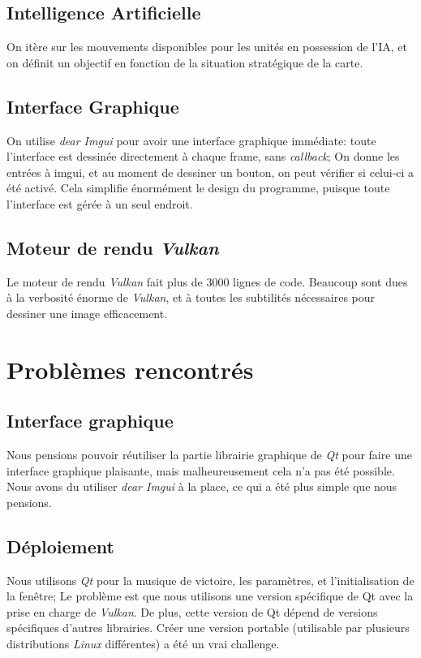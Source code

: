 \documentclass[french]{article}
\begin{document}
\subsection{Intelligence Artificielle}

On itère sur les mouvements disponibles pour les unités en possession de l'IA, et on définit un objectif en fonction de la situation stratégique de la carte.

\subsection{Interface Graphique}

On utilise \textit{dear Imgui} pour avoir une interface graphique immédiate: toute l'interface est dessinée directement à chaque frame, sans \textit{callback}; On donne les entrées à imgui, et au moment de dessiner un bouton, on peut vérifier si celui-ci a été activé. Cela simplifie énormément le design du programme, puisque toute l'interface est gérée à un seul endroit.

\subsection{Moteur de rendu \textit{Vulkan}}

Le moteur de rendu \textit{Vulkan} fait plus de 3000 lignes de code. Beaucoup sont dues à la verbosité énorme de \textit{Vulkan}, et à toutes les subtilités nécessaires pour dessiner une image efficacement.

\section{Problèmes rencontrés}

\subsection{Interface graphique}
Nous pensions pouvoir réutiliser la partie librairie graphique de \textit{Qt} pour faire une interface graphique plaisante, mais malheureusement cela n'a pas été possible. Nous avons du utiliser \textit{dear Imgui} à la place, ce qui a été plus simple que nous pensions.

\subsection{Déploiement}

Nous utilisons \textit{Qt} pour la musique de victoire, les paramètres, et l'initialisation de la fenêtre; Le problème est que nous utilisons une version spécifique de Qt avec la prise en charge de \textit{Vulkan}. De plus, cette version de Qt dépend de versions spécifiques d'autres librairies. Créer une version portable (utilisable par plusieurs distributions \textit{Linux} différentes) a été un vrai challenge.
\end{document}
